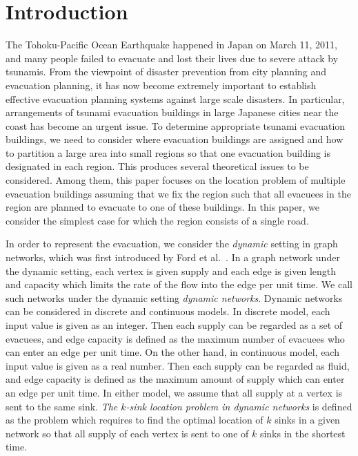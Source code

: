 \documentclass[a4paper]{llncs}
\begin{document}
\section{Introduction}
The Tohoku-Pacific Ocean Earthquake happened in Japan on March 11, 2011, 
and many people failed to evacuate and lost their lives due to severe attack by tsunamis. 
From the viewpoint of disaster prevention from city planning and evacuation planning,  
it has now become extremely important to establish effective evacuation planning systems against large scale disasters. In particular, 
arrangements of tsunami evacuation buildings in large Japanese cities near the coast has become an urgent issue. 
To determine appropriate tsunami evacuation buildings, we need to consider where evacuation buildings are assigned 
and how to partition a large area into small regions so that one evacuation building is designated in each region. 
This produces several theoretical issues to be considered. 
Among them, this paper focuses on the location problem of multiple evacuation buildings 
assuming that we fix the region such that all evacuees in the region are planned to evacuate to one of these buildings. 
In this paper, we consider the simplest case for which the region consists of a single road. 


In order to represent the evacuation, we consider the {\it dynamic} setting in graph networks, which was first introduced by Ford et al.~\cite{ff58}.
In a graph network under the dynamic setting, each vertex is given supply and each edge is given length and capacity which limits the rate of the flow into the edge per unit time.
We call such networks under the dynamic setting {\it dynamic networks}.
Dynamic networks can be considered in discrete and continuous models.
In discrete model, each input value is given as an integer.
Then each supply can be regarded as a set of evacuees, and edge capacity is defined as the maximum number of evacuees who can enter an edge per unit time.
On the other hand, in continuous model, each input value is given as a real number.
Then each supply can be regarded as fluid, and edge capacity is defined as the maximum amount of supply which can enter an edge per unit time.
In either model, we assume that all supply at a vertex is sent to the same sink.
{\it The $k$-sink location problem in dynamic networks} is defined as the problem which requires to find the optimal location of $k$ sinks in a given network 
so that all supply of each vertex is sent to one of $k$ sinks in the shortest time.
\end{document}
